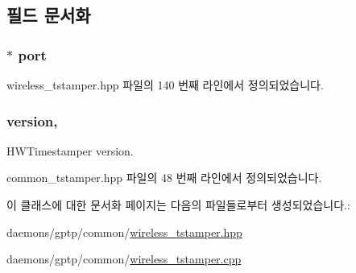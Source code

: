 \subsection{필드 문서화}
\subsubsection[{\texorpdfstring{port}{port}}]{$\ast$ port\hspace{0.3cm}{\ttfamily [private]}}\hypertarget{class_wireless_timestamper_a16e2f76ce8715713c1d3db843c27d2d3}{}\label{class_wireless_timestamper_a16e2f76ce8715713c1d3db843c27d2d3}


wireless\+\_\+tstamper.\+hpp 파일의 140 번째 라인에서 정의되었습니다.

\subsubsection[{\texorpdfstring{version}{version}}]{ version\hspace{0.3cm}{\ttfamily [protected]}, {\ttfamily [inherited]}}\hypertarget{class_common_timestamper_ab22abc2906422da61885ac6c8e6a1a59}{}\label{class_common_timestamper_ab22abc2906422da61885ac6c8e6a1a59}


H\+W\+Timestamper version. 



common\+\_\+tstamper.\+hpp 파일의 48 번째 라인에서 정의되었습니다.



이 클래스에 대한 문서화 페이지는 다음의 파일들로부터 생성되었습니다.\+:\begin{DoxyCompactItemize}
\item 
daemons/gptp/common/\hyperlink{wireless__tstamper_8hpp}{wireless\+\_\+tstamper.\+hpp}\item 
daemons/gptp/common/\hyperlink{wireless__tstamper_8cpp}{wireless\+\_\+tstamper.\+cpp}\end{DoxyCompactItemize}
